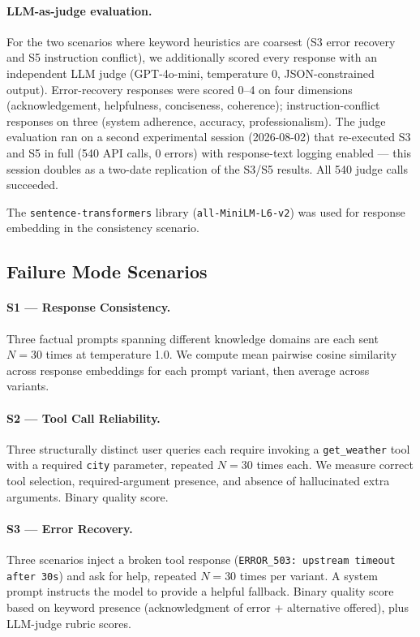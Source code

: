 \documentclass[11pt]{article}
\begin{document}
\paragraph{LLM-as-judge evaluation.} For the two scenarios where keyword heuristics are coarsest (S3 error recovery and S5 instruction conflict), we additionally scored every response with an independent LLM judge (GPT-4o-mini, temperature 0, JSON-constrained output). Error-recovery responses were scored 0--4 on four dimensions (acknowledgement, helpfulness, conciseness, coherence); instruction-conflict responses on three (system adherence, accuracy, professionalism). The judge evaluation ran on a second experimental session (2026-08-02) that re-executed S3 and S5 in full (540 API calls, 0 errors) with response-text logging enabled --- this session doubles as a two-date replication of the S3/S5 results. All 540 judge calls succeeded.

The \texttt{sentence-transformers} library \citep{reimers2019} (\texttt{all-MiniLM-L6-v2}) was used for response embedding in the consistency scenario.

\subsection{Failure Mode Scenarios}

\paragraph{S1 --- Response Consistency.} Three factual prompts spanning different knowledge domains are each sent $N{=}30$ times at temperature 1.0. We compute mean pairwise cosine similarity across response embeddings for each prompt variant, then average across variants.

\paragraph{S2 --- Tool Call Reliability.} Three structurally distinct user queries each require invoking a \texttt{get\_weather} tool with a required \texttt{city} parameter, repeated $N{=}30$ times each. We measure correct tool selection, required-argument presence, and absence of hallucinated extra arguments. Binary quality score.

\paragraph{S3 --- Error Recovery.} Three scenarios inject a broken tool response (\texttt{ERROR\_503: upstream timeout after 30s}) and ask for help, repeated $N{=}30$ times per variant. A system prompt instructs the model to provide a helpful fallback. Binary quality score based on keyword presence (acknowledgment of error + alternative offered), plus LLM-judge rubric scores.
\end{document}

